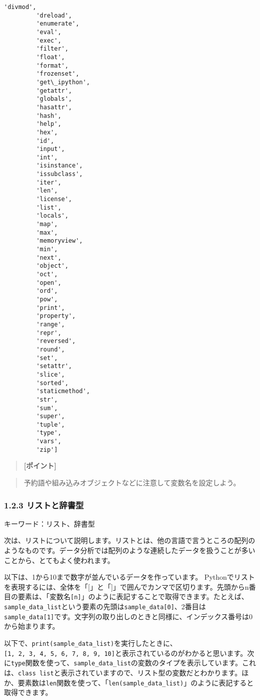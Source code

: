 \documentclass[11pt]{article}
\begin{document}
\begin{Verbatim}[commandchars=\\\{\}]
         'divmod',
         'dreload',
         'enumerate',
         'eval',
         'exec',
         'filter',
         'float',
         'format',
         'frozenset',
         'get\_ipython',
         'getattr',
         'globals',
         'hasattr',
         'hash',
         'help',
         'hex',
         'id',
         'input',
         'int',
         'isinstance',
         'issubclass',
         'iter',
         'len',
         'license',
         'list',
         'locals',
         'map',
         'max',
         'memoryview',
         'min',
         'next',
         'object',
         'oct',
         'open',
         'ord',
         'pow',
         'print',
         'property',
         'range',
         'repr',
         'reversed',
         'round',
         'set',
         'setattr',
         'slice',
         'sorted',
         'staticmethod',
         'str',
         'sum',
         'super',
         'tuple',
         'type',
         'vars',
         'zip']
\end{Verbatim}
            
    \begin{quote}
\textbf{{[}ポイント{]}}
\end{quote}

\begin{quote}
予約語や組み込みオブジェクトなどに注意して変数名を設定しよう。
\end{quote}

    \subsubsection{1.2.3
リストと辞書型}\label{ux30eaux30b9ux30c8ux3068ux8f9eux66f8ux578b}

キーワード：リスト、辞書型

    次は、リストについて説明します。リストとは、他の言語で言うところの配列のようなものです。データ分析では配列のような連続したデータを扱うことが多いことから、とてもよく使われます。

以下は、1から10まで数字が並んでいるデータを作っています。
Pythonでリストを表現するには、全体を「{[}」と「{]}」で囲んでカンマで区切ります。先頭からn番目の要素は、「変数名\texttt{{[}n{]}}」のように表記することで取得できます。たとえば、\texttt{sample\_data\_list}という要素の先頭は\texttt{sample\_data{[}0{]}}、2番目は\texttt{sample\_data{[}1{]}}です。文字列の取り出しのときと同様に、インデックス番号は0から始まります。

以下で、\texttt{print(sample\_data\_list)}を実行したときに、\texttt{{[}1,\ 2,\ 3,\ 4,\ 5,\ 6,\ 7,\ 8,\ 9,\ 10{]}}と表示されているのがわかると思います。次に\texttt{type}関数を使って、\texttt{sample\_data\_list}の変数のタイプを表示しています。これは、\texttt{class\ \textquotesingle{}list\textquotesingle{}}と表示されていますので、リスト型の変数だとわかります。ほか、要素数は\texttt{len}関数を使って、「\texttt{len(sample\_data\_list)}」のように表記すると取得できます。
\end{document}
